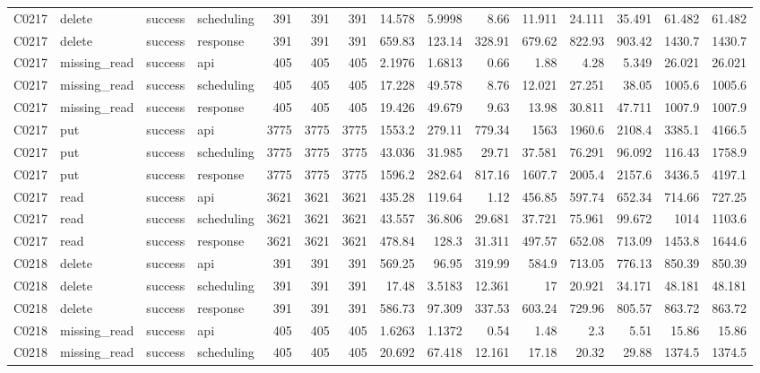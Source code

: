 \begin{landscape}
\begin{longtable}{llllrrrrrrrrrrr}
C0217 & delete & success & scheduling & 391 & 391 & 391 & 14.578 & 5.9998 & 8.66 & 11.911 & 24.111 & 35.491 & 61.482 & 61.482\\
C0217 & delete & success & response & 391 & 391 & 391 & 659.83 & 123.14 & 328.91 & 679.62 & 822.93 & 903.42 & 1430.7 & 1430.7\\
C0217 & missing\_\allowbreak{}read & success & api & 405 & 405 & 405 & 2.1976 & 1.6813 & 0.66 & 1.88 & 4.28 & 5.349 & 26.021 & 26.021\\
C0217 & missing\_\allowbreak{}read & success & scheduling & 405 & 405 & 405 & 17.228 & 49.578 & 8.76 & 12.021 & 27.251 & 38.05 & 1005.6 & 1005.6\\
C0217 & missing\_\allowbreak{}read & success & response & 405 & 405 & 405 & 19.426 & 49.679 & 9.63 & 13.98 & 30.811 & 47.711 & 1007.9 & 1007.9\\
C0217 & put & success & api & 3775 & 3775 & 3775 & 1553.2 & 279.11 & 779.34 & 1563 & 1960.6 & 2108.4 & 3385.1 & 4166.5\\
C0217 & put & success & scheduling & 3775 & 3775 & 3775 & 43.036 & 31.985 & 29.71 & 37.581 & 76.291 & 96.092 & 116.43 & 1758.9\\
C0217 & put & success & response & 3775 & 3775 & 3775 & 1596.2 & 282.64 & 817.16 & 1607.7 & 2005.4 & 2157.6 & 3436.5 & 4197.1\\
C0217 & read & success & api & 3621 & 3621 & 3621 & 435.28 & 119.64 & 1.12 & 456.85 & 597.74 & 652.34 & 714.66 & 727.25\\
C0217 & read & success & scheduling & 3621 & 3621 & 3621 & 43.557 & 36.806 & 29.681 & 37.721 & 75.961 & 99.672 & 1014 & 1103.6\\
C0217 & read & success & response & 3621 & 3621 & 3621 & 478.84 & 128.3 & 31.311 & 497.57 & 652.08 & 713.09 & 1453.8 & 1644.6\\
C0218 & delete & success & api & 391 & 391 & 391 & 569.25 & 96.95 & 319.99 & 584.9 & 713.05 & 776.13 & 850.39 & 850.39\\
C0218 & delete & success & scheduling & 391 & 391 & 391 & 17.48 & 3.5183 & 12.361 & 17 & 20.921 & 34.171 & 48.181 & 48.181\\
C0218 & delete & success & response & 391 & 391 & 391 & 586.73 & 97.309 & 337.53 & 603.24 & 729.96 & 805.57 & 863.72 & 863.72\\
C0218 & missing\_\allowbreak{}read & success & api & 405 & 405 & 405 & 1.6263 & 1.1372 & 0.54 & 1.48 & 2.3 & 5.51 & 15.86 & 15.86\\
C0218 & missing\_\allowbreak{}read & success & scheduling & 405 & 405 & 405 & 20.692 & 67.418 & 12.161 & 17.18 & 20.32 & 29.88 & 1374.5 & 1374.5\\

\end{longtable}
\end{landscape}
